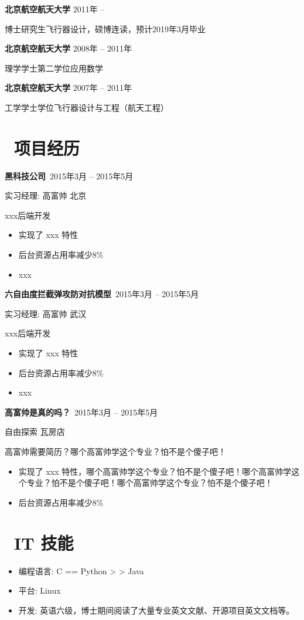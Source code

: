 \documentclass[11pt]{article}
\begin{document}
\textbf{北京航空航天大学} \hfill 2011年 -- 

博士研究生\quad 飞行器设计，硕博连读，预计2019年3月毕业

\textbf{北京航空航天大学} \hfill 2008年 -- 2011年

理学学士第二学位\quad 应用数学

\textbf{北京航空航天大学} \hfill 2007年 -- 2011年

工学学士学位\quad 飞行器设计与工程（航天工程）

\section{\makebox[\widthof{\faGraduationCap}][c]{\color{CVBlue}\faUsers}\ 项目经历}

\textbf{黑科技公司}\  \hfill 2015年3月 -- 2015年5月

实习\quad 经理: 高富帅 \hfill 北京

xxx后端开发
\begin{itemize}
  \item 实现了 xxx 特性
  \item 后台资源占用率减少8\%
  \item xxx
\end{itemize}

\textbf{六自由度拦截弹攻防对抗模型\Cpp}\  \hfill 2015年3月 -- 2015年5月

实习\quad 经理: 高富帅  \hfill 武汉

xxx后端开发\Cpp
\begin{itemize}
  \item 实现了 xxx 特性
  \item 后台资源占用率减少8\%
  \item xxx
\end{itemize}

\textbf{高富帅是真的吗？}\  \hfill 2015年3月 -- 2015年5月

自由探索  \hfill 瓦房店

高富帅需要简历？哪个高富帅学这个专业？怕不是个傻子吧！
\begin{itemize}
  \item 实现了 xxx 特性，哪个高富帅学这个专业？怕不是个傻子吧！哪个高富帅学这个专业？怕不是个傻子吧！哪个高富帅学这个专业？怕不是个傻子吧！
  \item 后台资源占用率减少8\%
\end{itemize}

\section{\makebox[\widthof{\faGraduationCap}][c]{\color{CVBlue}\faCogs}\ IT 技能}
\begin{itemize}[parsep=0.5ex]
  \item 编程语言: C == Python > \Cpp > Java
  \item 平台: Linux
  \item 开发: 英语六级，博士期间阅读了大量专业英文文献、开源项目英文文档等。
\end{itemize}
\end{document}
